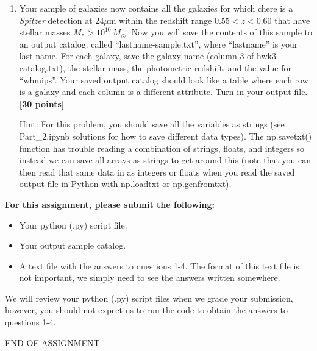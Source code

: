 \documentclass[11pt]{article}    %
\begin{document}
\begin{enumerate}
\vspace{1mm}
\item
\noindent
Your sample of galaxies now contains all the galaxies for which
chere is a \emph{Spitzer} detection at 24$\mu$m within the redshift
range $0.55< z < 0.60$ that have stellar masses $M_*>10^{10} \,
M_{\odot}$.  Now you will save the contents of this sample to an output catalog.
called ``lastname-sample.txt'', where ``lastname'' is your last name.
For each galaxy, save the galaxy name (column 3 of hwk3-catalog.txt),
the stellar mass, the photometric redshift, and the value for
``whmips''.  Your saved  output catalog  should look like a table where each row
is a galaxy and each column is a different attribute. Turn in your
output file. \textbf{[30 points]}

Hint: For this problem, you should save all the variables as strings (see Part\_2.ipynb solutions for how to save different data types). The np.savetxt() function has trouble reading a combination of strings, floats, and integers so instead we can save all arrays as strings to get around this (note that you can then read that same data in as integers or floats when you read the saved output file in Python with  np.loadtxt or np.genfromtxt).
\end{enumerate}

\vspace{2mm}

\noindent
\textbf{For this assignment, please submit the following:}

\begin{itemize}
	\item Your python (.py) script file.
	\item Your output sample catalog.
	\item A text file with the answers to questions 1-4. The format of this text file is not important, we simply need to see the answers written somewhere.
\end{itemize}

\noindent
We will review your python (.py) script files when we grade your submission, however, you should not expect us to run the code to obtain the answers to questions 1-4.

\vspace{2mm}
\begin{center}
END OF ASSIGNMENT
\end{center}
\end{document}
